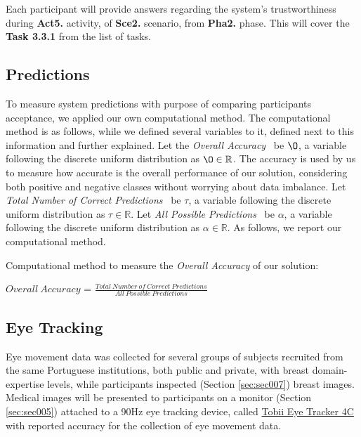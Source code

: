 Each participant will provide answers regarding the system's trustworthiness during {\bf Act5.} activity, of {\bf Sce2.} scenario, from {\bf Pha2.} phase.
This will cover the {\bf Task 3.3.1} from the list of tasks.

\subsection{Predictions}

To measure system predictions with purpose of comparing participants acceptance, we applied our own computational method.
The computational method is as follows, while we defined several variables to it, defined next to this information and further explained.
Let the {\it Overall Accuracy}~\cite{ashraf2018comparative, li2018digital} be $\O$, a variable following the discrete uniform distribution as $\O \in \mathbb{R}$. The accuracy is used by us to measure how accurate is the overall performance of our solution, considering both positive and negative classes without worrying about data imbalance. Let {\it Total Number of Correct Predictions}~\cite{ashraf2018comparative, li2018digital} be $\tau$, a variable following the discrete uniform distribution as $\tau \in \mathbb{R}$.
Let {\it All Possible Predictions}~\cite{ashraf2018comparative, li2018digital} be $\alpha$, a variable following the discrete uniform distribution as $\alpha \in \mathbb{R}$. As follows, we report our computational method.

\hfill

Computational method to measure the {\it Overall Accuracy} of our solution:

\begin{Form}
\large
\begin{center}
$Overall~Accuracy$ = $\frac{Total~Number~of~Correct~Predictions}{All~Possible~Predictions}$
\end{center}
\end{Form}

\subsection{Eye Tracking}

Eye movement data was collected for several groups of subjects recruited from the same Portuguese institutions, both public and private, with breast domain-expertise levels, while participants inspected (Section \ref{sec:sec007}) breast images. Medical images will be presented to participants on a monitor (Section \ref{sec:sec005}) attached to a 90Hz eye tracking device, called \hyperlink{https://gaming.tobii.com/product/tobii-eye-tracker-4c/}{Tobii Eye Tracker 4C} with reported accuracy for the collection of eye movement data.

